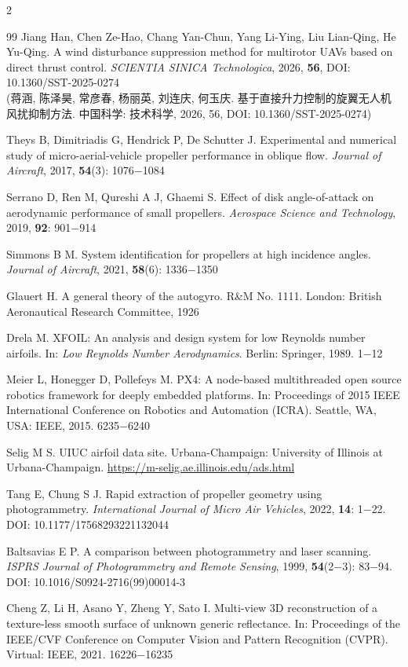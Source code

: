 \documentclass{aas}
\begin{document}
\begin{multicols}{2}
\begin{thebibliography}{99}
 Jiang Han, Chen Ze-Hao, Chang Yan-Chun, Yang Li-Ying, Liu Lian-Qing, He Yu-Qing. A wind disturbance suppression method for multirotor UAVs based on direct thrust control. {\sl SCIENTIA SINICA Technologica}, 2026, {\bf 56}, DOI: 10.1360/SST-2025-0274 \\
(蒋涵, 陈泽昊, 常彦春, 杨丽英, 刘连庆, 何玉庆. 基于直接升力控制的旋翼无人机风扰抑制方法. 中国科学: 技术科学, 2026, 56, DOI: 10.1360/SST-2025-0274)

 Theys B, Dimitriadis G, Hendrick P, De Schutter J. Experimental and numerical study of micro-aerial-vehicle propeller performance in oblique flow. {\sl Journal of Aircraft}, 2017, {\bf 54}(3): 1076$-$1084

 Serrano D, Ren M, Qureshi A J, Ghaemi S. Effect of disk angle-of-attack on aerodynamic performance of small propellers. {\sl Aerospace Science and Technology}, 2019, {\bf 92}: 901$-$914

 Simmons B M. System identification for propellers at high incidence angles. {\sl Journal of Aircraft}, 2021, {\bf 58}(6): 1336$-$1350

 Glauert H. A general theory of the autogyro. R\&M No. 1111. London: British Aeronautical Research Committee, 1926

 Drela M. XFOIL: An analysis and design system for low Reynolds number airfoils. In: {\sl Low Reynolds Number Aerodynamics}. Berlin: Springer, 1989. 1$-$12

 Meier L, Honegger D, Pollefeys M. PX4: A node-based multithreaded open source robotics framework for deeply embedded platforms. In: Proceedings of 2015 IEEE International Conference on Robotics and Automation (ICRA). Seattle, WA, USA: IEEE, 2015. 6235$-$6240

 Selig M S. UIUC airfoil data site. Urbana-Champaign: University of Illinois at Urbana-Champaign. \url{https://m-selig.ae.illinois.edu/ads.html}

 Tang E, Chung S J. Rapid extraction of propeller geometry using photogrammetry. {\sl International Journal of Micro Air Vehicles}, 2022, {\bf 14}: 1$-$22. DOI: 10.1177/17568293221132044

 Baltsavias E P. A comparison between photogrammetry and laser scanning. {\sl ISPRS Journal of Photogrammetry and Remote Sensing}, 1999, {\bf 54}(2$-$3): 83$-$94. DOI: 10.1016/S0924-2716(99)00014-3

 Cheng Z, Li H, Asano Y, Zheng Y, Sato I. Multi-view 3D reconstruction of a texture-less smooth surface of unknown generic reflectance. In: Proceedings of the IEEE/CVF Conference on Computer Vision and Pattern Recognition (CVPR). Virtual: IEEE, 2021. 16226$-$16235


\end{thebibliography}
\end{multicols}
\end{document}

